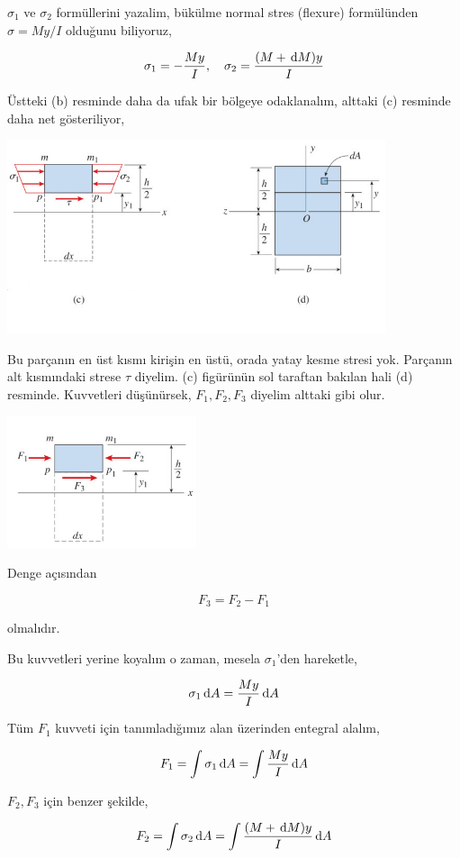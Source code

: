 \documentclass[12pt,fleqn]{article}\usepackage{../../common}
\begin{document}
$\sigma_1$ ve $\sigma_2$ formüllerini yazalim, bükülme normal stres (flexure)
formülünden $\sigma = My / I$ olduğunu biliyoruz,

$$
\sigma_1 = -\frac{My}{I}, \quad
\sigma_2 = \frac{(M + \,\mathrm{d} M)y}{I}
$$

Üstteki (b) resminde daha da ufak bir bölgeye odaklanalım, alttaki (c)
resminde daha net gösteriliyor,

\includegraphics[width=30em]{phy_020_strs_02_03.jpg}

Bu parçanın en üst kısmı kirişin en üstü, orada yatay kesme stresi yok.
Parçanın alt kısmındaki strese $\tau$ diyelim. (c) figürünün sol taraftan
bakılan hali (d) resminde. Kuvvetleri düşünürsek, $F_1,F_2,F_3$ diyelim alttaki
gibi olur.

\includegraphics[width=15em]{phy_020_strs_02_04.jpg}

Denge açısından

$$
F_3 = F_2 - F_1
$$

olmalıdır.

Bu kuvvetleri yerine koyalım o zaman, mesela $\sigma_1$'den hareketle,

$$
\sigma_1 \,\mathrm{d} A = \frac{My}{I} \,\mathrm{d} A
$$

Tüm $F_1$ kuvveti için tanımladığımız alan üzerinden entegral alalım,

$$
F_1 = \int \sigma_1 \,\mathrm{d} A = \int \frac{My}{I} \,\mathrm{d} A
$$

$F_2,F_3$ için benzer şekilde,

$$
F_2 = \int \sigma_2 \,\mathrm{d} A = \int \frac{(M + \,\mathrm{d} M)y}{I} \,\mathrm{d} A
$$
\end{document}

